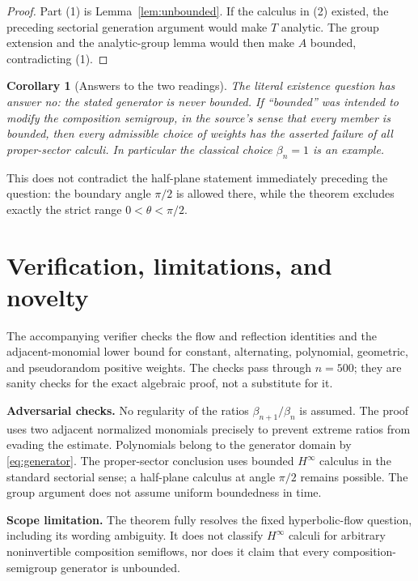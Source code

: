 \documentclass[10pt]{article}
\newtheorem{corollary}[theorem]{Corollary}
\begin{document}
\begin{proof}
Part (1) is Lemma~\ref{lem:unbounded}.  If the calculus in (2) existed, the
preceding sectorial generation argument would make $T$ analytic.  The group
extension and the analytic-group lemma would then make $A$ bounded,
contradicting (1).
\end{proof}

\begin{corollary}[Answers to the two readings]
The literal existence question has answer \emph{no}: the stated generator is
never bounded.  If ``bounded'' was intended to modify the composition
semigroup, in the source's sense that every member is bounded, then every
admissible choice of weights has the asserted failure of all proper-sector
calculi.  In particular the classical choice $\beta_n=1$ is an example.
\end{corollary}

This does not contradict the half-plane statement immediately preceding the
question: the boundary angle $\pi/2$ is allowed there, while the theorem
excludes exactly the strict range $0<\theta<\pi/2$.

\section{Verification, limitations, and novelty}

The accompanying verifier checks the flow and reflection identities and the
adjacent-monomial lower bound for constant, alternating, polynomial,
geometric, and pseudorandom positive weights.  The checks pass through
$n=500$; they are sanity checks for the exact algebraic proof, not a
substitute for it.

\textbf{Adversarial checks.}
No regularity of the ratios $\beta_{n+1}/\beta_n$ is assumed.  The proof uses
two adjacent normalized monomials precisely to prevent extreme ratios from
evading the estimate.  Polynomials belong to the generator domain by
\eqref{eq:generator}.  The proper-sector conclusion uses bounded
$H^\infty$ calculus in the standard sectorial sense; a half-plane calculus
at angle $\pi/2$ remains possible.  The group argument does not assume
uniform boundedness in time.

\textbf{Scope limitation.}
The theorem fully resolves the fixed hyperbolic-flow question, including its
wording ambiguity.  It does not classify $H^\infty$ calculi for arbitrary
noninvertible composition semiflows, nor does it claim that every
composition-semigroup generator is unbounded.
\end{document}
